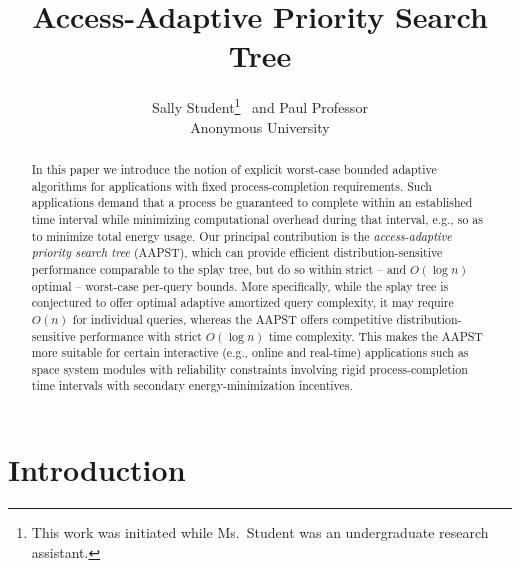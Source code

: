 \documentclass{article}
\title{\bf Access-Adaptive Priority Search Tree\vspace{-0.1in}}
\author{\large {Sally Student}\thanks{This work was initiated while Ms.\ Student was an undergraduate research assistant.} ~and {Paul Professor} \\
Anonymous University}
\date{}
\begin{document}
\maketitle

\begin{abstract}
In this paper we introduce the notion of explicit worst-case bounded adaptive algorithms for applications with fixed process-completion requirements. Such applications demand that a process be guaranteed to complete within an established time interval while minimizing computational overhead during that interval, e.g., so as to minimize total energy usage. Our principal contribution is the {\em access-adaptive priority search tree} (AAPST), which can provide efficient distribution-sensitive performance comparable to the splay tree, but do so within strict -- and $O(\log n)$ optimal -- worst-case per-query bounds. More specifically, while the splay tree is conjectured to offer optimal adaptive amortized query complexity, it may require $O(n)$ for individual queries, whereas the AAPST offers competitive distribution-sensitive performance with strict $O(\log n)$ time complexity. This makes the AAPST more suitable for certain interactive (e.g., online and real-time) applications such as space system modules with reliability constraints involving rigid process-completion time intervals with secondary energy-minimization incentives.\\
\end{abstract}

\newpage

\section{Introduction}
\end{document}
